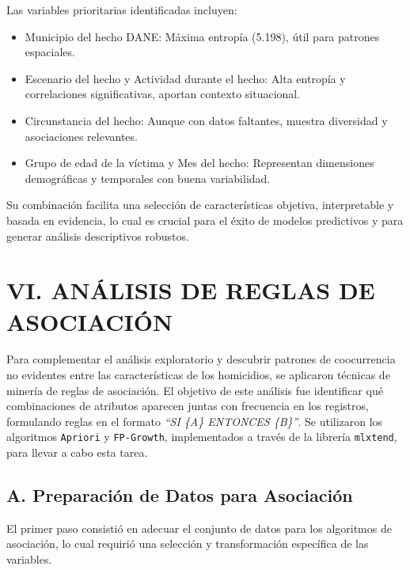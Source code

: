 \documentclass[lettersize,journal]{IEEEtran}
\begin{document}
Las variables prioritarias identificadas incluyen:

\begin{itemize}
    \item Municipio del hecho DANE: Máxima entropía (5.198), útil para patrones espaciales.
    \item Escenario del hecho y Actividad durante el hecho: Alta entropía y correlaciones significativas, aportan contexto situacional.
    \item Circunstancia del hecho: Aunque con datos faltantes, muestra diversidad y asociaciones relevantes.
    \item Grupo de edad de la víctima y Mes del hecho: Representan dimensiones demográficas y temporales con buena variabilidad.
\end{itemize}

Su combinación facilita una selección de características objetiva, interpretable y basada en evidencia, lo cual es crucial para el éxito de modelos predictivos y para generar análisis descriptivos robustos.


\section*{VI. ANÁLISIS DE REGLAS DE ASOCIACIÓN}

Para complementar el análisis exploratorio y descubrir patrones de coocurrencia no evidentes entre las características de los homicidios, se aplicaron técnicas de minería de reglas de asociación. El objetivo de este análisis fue identificar qué combinaciones de atributos aparecen juntas con frecuencia en los registros, formulando reglas en el formato \textit{``SI \{A\} ENTONCES \{B\}''}. Se utilizaron los algoritmos \texttt{Apriori} y \texttt{FP-Growth}, implementados a través de la librería \texttt{mlxtend}, para llevar a cabo esta tarea.

\subsection*{A. Preparación de Datos para Asociación}

El primer paso consistió en adecuar el conjunto de datos para los algoritmos de asociación, lo cual requirió una selección y transformación específica de las variables.
\end{document}
